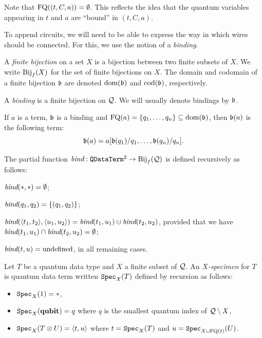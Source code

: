 \documentclass[twoside]{article}
\begin{document}
Note that $\mathop{\textrm{FQ}}\nolimits((t,C,a))=\emptyset$. This reflects the idea that the 
quantum variables appearing in $t$ and $a$ are ``bound'' in $(t,C,a)$. 

To append circuits, we will need to be able to express the way in 
which wires should be connected. For this, we use the notion of a 
\emph{binding}.

\begin{definition}
  A \emph{finite bijection} on a set $X$ is a bijection between two
  finite subsets of $X$. We write $\textrm{\rm Bij}_f(X)$ for the set of finite
  bijections on $X$. The domain and codomain of a finite bijection
  $\mathfrak{b}$ are denoted $\mathop{\textrm{\rm dom}}\nolimits(\mathfrak{b})$ and $\mathop{\textrm{\rm cod}}\nolimits(\mathfrak{b})$,
  respectively. 
\end{definition}

\begin{definition}
  A \emph{binding} is a finite bijection on $\mathcal{Q}$. We will usually
  denote bindings by $\mathfrak{b}$.
\end{definition}

\begin{definition}
  If $a$ is a term, $\mathfrak{b}$ is a binding and
  $\mathop{\textrm{FQ}}\nolimits(a)=\{q_1,\ldots,q_n\}\subseteq\mathop{\textrm{\rm dom}}\nolimits(\mathfrak{b})$, then
  $\mathfrak{b}(a)$ is the following term:
\[
\mathfrak{b}(a)= a[\mathfrak{b}(q_1)/q_1,\ldots ,\mathfrak{b}(q_n)/q_n].
\]
\end{definition}

\begin{definition}
The partial function $\mathop{\textit{bind}}\nolimits: \texttt{QDataTerm}^2\to \textrm{\rm Bij}_f(\mathcal{Q})$ is 
defined recursively as follows:
\begin{compactitemize}
\item $\mathop{\textit{bind}}\nolimits (*,*)= \emptyset$;
\item $\mathop{\textit{bind}}\nolimits (q_1,q_2)= \{(q_1,q_2)\}$;
\item $\bind (\p{t_1,t_2},\p{u_1,u_2})=\bind (t_1,u_1) \cupdot \bind
  (t_2,u_2)$, provided that we have $\mathop{\textit{bind}}\nolimits (t_1,u_1) \cap \mathop{\textit{bind}}\nolimits
  (t_2,u_2) = \emptyset$;
\item $\mathop{\textit{bind}}\nolimits (t,u)= \mbox{undefined}$, in all remaining cases.
\end{compactitemize}
\end{definition}

\begin{definition}
Let $T$ be a quantum data type and $X$ a finite subset of $\mathcal{Q}$. 
An \emph{$X$-specimen} for $T$ is quantum data term written $\texttt{Spec}_X(T)$ 
defined by recursion as follows:
\begin{itemize}
  \item $\texttt{Spec}_X(1)=*$,
  \item $\texttt{Spec}_X(\textrm{\bf qubit})=q$ where $q$ is the smallest quantum 
  index of $\mathcal{Q}\setminus X$,
  \item $\texttt{Spec}_X(T\otimes U)=\langle t,u\rangle$ where $t=\texttt{Spec}_X(T)$ 
  and $u=\texttt{Spec}_{X\cup \mathop{\textrm{FQ}}\nolimits(t)}(U)$.  
\end{itemize}
\end{definition}
\end{document}

